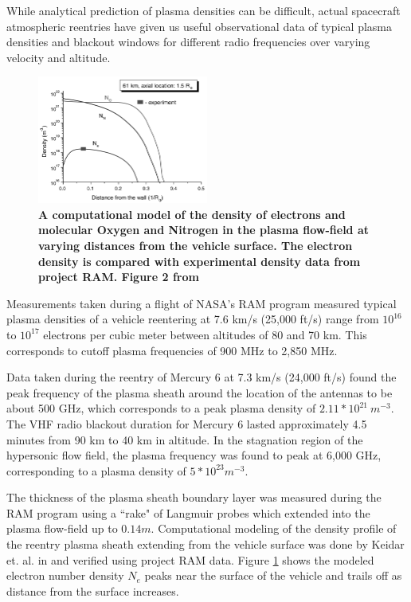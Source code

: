 \documentclass[twocolumn]{article}
\begin{document}
While analytical prediction of plasma densities can be difficult, actual spacecraft atmospheric reentries have given us useful observational data of typical plasma densities and blackout windows for different radio frequencies over varying velocity and altitude.

\begin{figure}[!ht]
	\centering
	\includegraphics[width=0.5\textwidth]{Images/PlasmaDensity_Keideretal}
	\caption[Computational model of plasma density at varying distances from the vehicle surface.]{\textbf{A computational model of the density of electrons and molecular Oxygen and Nitrogen in the plasma flow-field at varying distances from the vehicle surface. The electron density is compared with experimental density data from project RAM. Figure 2 from \cite{keidar_electromagnetic_2008}}}
	\label{fig:PlasmaDensity_Keideretal}
\end{figure}

Measurements taken during a flight of NASA's RAM program measured typical plasma densities of a vehicle reentering at 7.6 km/s (25,000 ft/s) range from $10^{16}$ to $10^{17}$ electrons per cubic meter between altitudes of 80 and 70 km.\cite{akey_radio_1970}
This corresponds to cutoff plasma frequencies of 900 MHz to 2,850 MHz.

Data taken during the reentry of Mercury 6 at 7.3 km/s (24,000 ft/s) found the peak frequency of the plasma sheath around the location of the antennas to be about 500 GHz, which corresponds to a peak plasma density of $2.11*10^{21} \  m^{-3}$.
The VHF radio blackout duration for Mercury 6 lasted approximately 4.5 minutes from 90 km to 40 km in altitude.
In the stagnation region of the hypersonic flow field, the plasma frequency was found to peak at 6,000 GHz, corresponding to a plasma density of $5*10^{23} m^{-3}$. \cite{lehnert_plasma_1964}

The thickness of the plasma sheath boundary layer was measured during the RAM program using a ``rake" of Langmuir probes which extended into the plasma flow-field up to $0.14m$.\cite{rybak_causes_1970}
Computational modeling of the density profile of the reentry plasma sheath extending from the vehicle surface was done by Keidar et. al. in \cite{keidar_electromagnetic_2008} and verified using project RAM data.
Figure \ref{fig:PlasmaDensity_Keideretal} shows the modeled electron number density $N_e$ peaks near the surface of the vehicle and trails off as distance from the surface increases.
\end{document}
